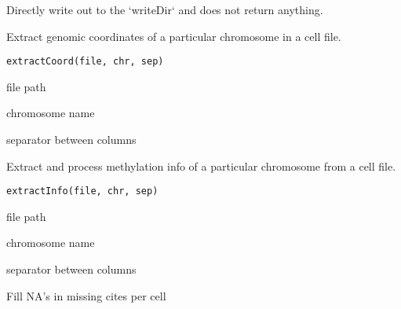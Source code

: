 \documentclass[letterpaper]{book}
\begin{document}
%
\begin{Value}
Directly write out to the `writeDir` and does not return anything.
\end{Value}
%
\begin{Description}
Extract genomic coordinates of a particular chromosome in a cell file.
\end{Description}
%
\begin{Usage}
\begin{verbatim}
extractCoord(file, chr, sep)
\end{verbatim}
\end{Usage}
%
\begin{Arguments}
\begin{ldescription}
\item[\code{file}] file path

\item[\code{chr}] chromosome name

\item[\code{sep}] separator between columns
\end{ldescription}
\end{Arguments}
%
\begin{Description}
Extract and process methylation info of a particular chromosome from a cell file.
\end{Description}
%
\begin{Usage}
\begin{verbatim}
extractInfo(file, chr, sep)
\end{verbatim}
\end{Usage}
%
\begin{Arguments}
\begin{ldescription}
\item[\code{file}] file path

\item[\code{chr}] chromosome name

\item[\code{sep}] separator between columns
\end{ldescription}
\end{Arguments}
%
\begin{Description}
Fill NA's in missing cites per cell
\end{Description}
\end{document}
